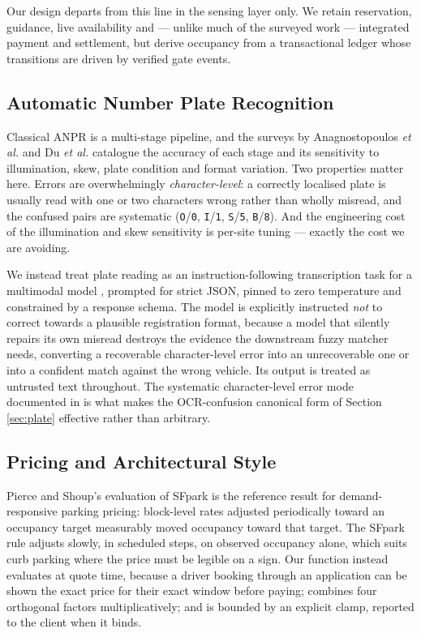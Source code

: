 \documentclass[journal,onecolumn,11pt]{IEEEtran}
\begin{document}
Our design departs from this line in the sensing layer only. We retain
reservation, guidance, live availability and --- unlike much of the surveyed
work --- integrated payment and settlement, but derive occupancy from a
transactional ledger whose transitions are driven by verified gate events.

\subsection{Automatic Number Plate Recognition}

Classical ANPR is a multi-stage pipeline, and the surveys by Anagnostopoulos
\emph{et al.} \cite{anagnostopoulos2008survey} and Du \emph{et al.}
\cite{du2013alpr} catalogue the accuracy of each stage and its sensitivity to
illumination, skew, plate condition and format variation. Two properties matter
here. Errors are overwhelmingly \emph{character-level}: a correctly localised
plate is usually read with one or two characters wrong rather than wholly
misread, and the confused pairs are systematic (\texttt{O}/\texttt{0},
\texttt{I}/\texttt{1}, \texttt{S}/\texttt{5}, \texttt{B}/\texttt{8}). And the
engineering cost of the illumination and skew sensitivity is per-site tuning
--- exactly the cost we are avoiding.

We instead treat plate reading as an instruction-following transcription task
for a multimodal model \cite{gemini2023}, prompted for strict JSON, pinned to
zero temperature and constrained by a response schema. The model is explicitly
instructed \emph{not} to correct towards a plausible registration format,
because a model that silently repairs its own misread destroys the evidence the
downstream fuzzy matcher needs, converting a recoverable character-level error
into an unrecoverable one or into a confident match against the wrong vehicle.
Its output is treated as untrusted text throughout. The systematic
character-level error mode documented in
\cite{anagnostopoulos2008survey,du2013alpr} is what makes the OCR-confusion
canonical form of Section \ref{sec:plate} effective rather than arbitrary.

\subsection{Pricing and Architectural Style}

Pierce and Shoup's evaluation of SFpark \cite{pierce2013getting} is the
reference result for demand-responsive parking pricing: block-level rates
adjusted periodically toward an occupancy target measurably moved occupancy
toward that target. The SFpark rule adjusts slowly, in scheduled steps, on
observed occupancy alone, which suits curb parking where the price must be
legible on a sign. Our function instead evaluates at quote time, because a
driver booking through an application can be shown the exact price for their
exact window before paying; combines four orthogonal factors multiplicatively;
and is bounded by an explicit clamp, reported to the client when it binds.
\end{document}
